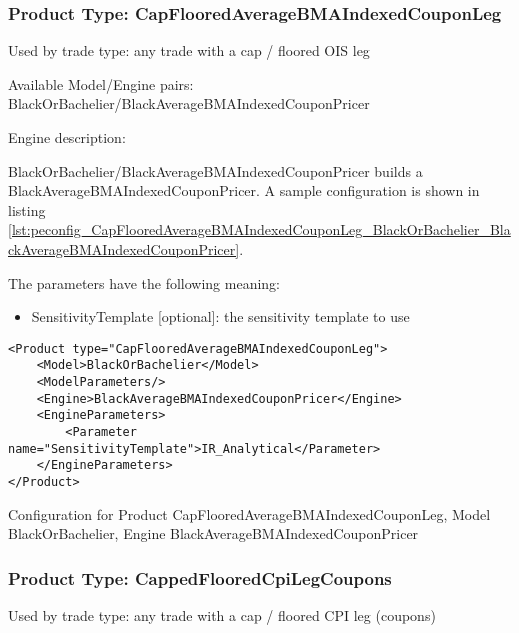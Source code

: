 \subsubsection{Product Type: CapFlooredAverageBMAIndexedCouponLeg}

Used by trade type: any trade with a cap / floored OIS leg

Available Model/Engine pairs: BlackOrBachelier/BlackAverageBMAIndexedCouponPricer

Engine description:

BlackOrBachelier/BlackAverageBMAIndexedCouponPricer builds a BlackAverageBMAIndexedCouponPricer. A sample configuration is
shown in listing \ref{lst:peconfig_CapFlooredAverageBMAIndexedCouponLeg_BlackOrBachelier_BlackAverageBMAIndexedCouponPricer}.

The parameters have the following meaning:

\begin{itemize}
\item SensitivityTemplate [optional]: the sensitivity template to use 
\end{itemize}

\begin{longlisting}
\begin{verbatim}
<Product type="CapFlooredAverageBMAIndexedCouponLeg">
    <Model>BlackOrBachelier</Model>
    <ModelParameters/>
    <Engine>BlackAverageBMAIndexedCouponPricer</Engine>
    <EngineParameters>
        <Parameter name="SensitivityTemplate">IR_Analytical</Parameter>
    </EngineParameters>
</Product>
\end{verbatim}
\caption{Configuration for Product CapFlooredAverageBMAIndexedCouponLeg, Model BlackOrBachelier, Engine BlackAverageBMAIndexedCouponPricer}
\label{lst:peconfig_CapFlooredAverageBMAIndexedCouponLeg_BlackOrBachelier_BlackAverageBMAIndexedCouponPricer}
\end{longlisting}

\subsubsection{Product Type: CappedFlooredCpiLegCoupons}

Used by trade type: any trade with a cap / floored CPI leg (coupons)


